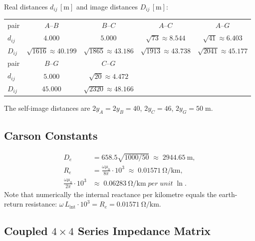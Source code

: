 \documentclass[11pt,a4paper]{article}
\newcommand{\Lint}{L_{\mathrm{int}}}
\begin{document}
Real distances \(d_{ij}\,[\si{\metre}]\) and image distances
\(D_{ij}\,[\si{\metre}]\):
\begin{center}
\begin{tabular}{lcccc}
\toprule
pair & $A$--$B$ & $B$--$C$ & $A$--$C$ & $A$--$G$ \\
$d_{ij}$ & $4.000$ & $5.000$ & $\sqrt{73}\!\approx\!8.544$ & $\sqrt{41}\!\approx\!6.403$ \\
$D_{ij}$ & $\sqrt{1616}\!\approx\!40.199$ & $\sqrt{1865}\!\approx\!43.186$ & $\sqrt{1913}\!\approx\!43.738$ & $\sqrt{2041}\!\approx\!45.177$ \\
\midrule
pair & $B$--$G$ & $C$--$G$ & & \\
$d_{ij}$ & $5.000$ & $\sqrt{20}\!\approx\!4.472$ & & \\
$D_{ij}$ & $45.000$ & $\sqrt{2320}\!\approx\!48.166$ & & \\
\bottomrule
\end{tabular}
\end{center}
The self-image distances are \(2y_{A}=2y_{B}=40\), \(2y_{C}=46\),
\(2y_{G}=50\;\si{\metre}\).

\subsection{Carson Constants}

\begin{align*}
D_{e} &= 658.5\sqrt{1000/50} \;\approx\; \SI{2944.65}{\metre},\\
R_{e} &= \frac{\omega\mu_{0}}{8\pi}\cdot 10^{3}
        \;\approx\; \SI{0.01571}{\ohm/\kilo\metre},\\
\frac{\omega\mu_{0}}{2\pi}\cdot 10^{3}
      &\approx\; \SI{0.06283}{\ohm/\kilo\metre\;per\;unit\;\ln}.
\end{align*}
Note that numerically the internal reactance per kilometre equals the
earth-return resistance: \(\omega\,\Lint\cdot 10^{3}=R_{e}=\SI{0.01571}{\ohm/\kilo\metre}\).

\subsection{Coupled \texorpdfstring{$4\times 4$}{4x4} Series Impedance Matrix}
\end{document}
